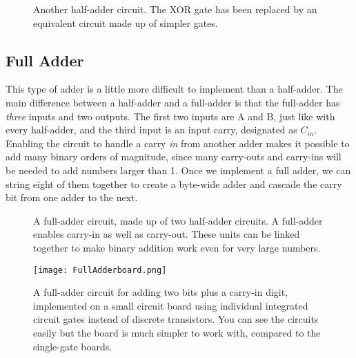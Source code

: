 \begin{figure}[!hb]
\begin{center}



\caption{Another half-adder circuit. The XOR gate has been replaced by an equivalent circuit made up of simpler gates.}
\end{center}
\end{figure}


\subsection*{Full Adder}

This type of adder is a little more difficult to implement than a half-adder. The main difference between a half-adder and a full-adder is that the full-adder has \emph{three} inputs and two outputs. The first two inputs are A and B, just like with every half-adder, and the third input is an input carry, designated as $C_{in}$. Enabling the circuit to handle a carry \emph{in} from another adder makes it possible to add many binary orders of magnitude, since many carry-outs and carry-ins will be needed to add numbers larger than 1. Once we implement a full adder, we can string eight of them together to create a byte-wide adder and cascade the carry bit from one adder to the next.
\bigskip

\begin{figure}[!hb]
\begin{center}

\caption{A full-adder circuit, made up of two half-adder circuits. A full-adder enables carry-in as well as carry-out. These units can be linked together to make binary addition work even for very large numbers.}
\end{center}
\end{figure}


\begin{figure}[!ht]
\begin{center}
\texttt{[image: FullAdderboard.png]}
\caption{A full-adder circuit for adding two bits plus a carry-in digit, implemented on a small circuit board using individual integrated circuit gates instead of discrete transistors. You can see the circuits easily but the board is much simpler to work with, compared to the single-gate boards.}
\end{center}
\end{figure}




